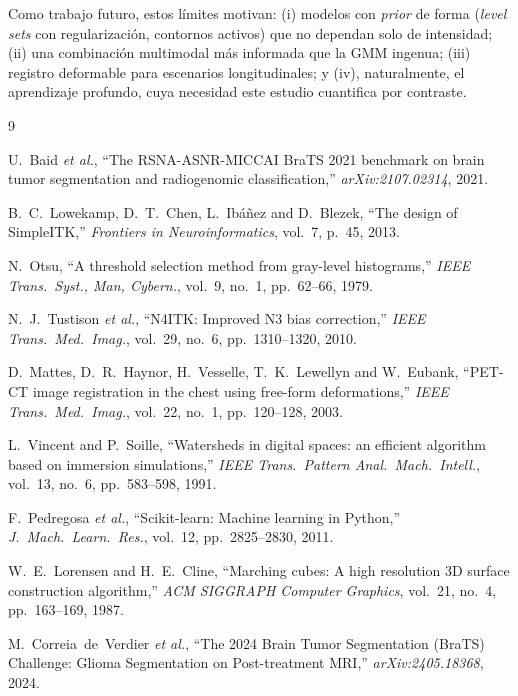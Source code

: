 \documentclass[conference]{IEEEtran}
\begin{document}
Como trabajo futuro, estos límites motivan: (i) modelos con
\emph{prior} de forma (\textit{level sets} con regularización,
contornos activos) que no dependan solo de intensidad; (ii) una
combinación multimodal más informada que la GMM ingenua;
(iii) registro deformable para escenarios longitudinales; y
(iv), naturalmente, el aprendizaje profundo, cuya necesidad este
estudio cuantifica por contraste.

\begin{thebibliography}{9}

U.~Baid \emph{et al.},
``The RSNA-ASNR-MICCAI BraTS 2021 benchmark on brain tumor
segmentation and radiogenomic classification,''
\emph{arXiv:2107.02314}, 2021.

B.~C.~Lowekamp, D.~T.~Chen, L.~Ibáñez and D.~Blezek,
``The design of SimpleITK,''
\emph{Frontiers in Neuroinformatics}, vol.~7, p.~45, 2013.

N.~Otsu,
``A threshold selection method from gray-level histograms,''
\emph{IEEE Trans.\ Syst., Man, Cybern.}, vol.~9, no.~1,
pp.~62--66, 1979.

N.~J.~Tustison \emph{et al.},
``N4ITK: Improved N3 bias correction,''
\emph{IEEE Trans.\ Med.\ Imag.}, vol.~29, no.~6,
pp.~1310--1320, 2010.

D.~Mattes, D.~R.~Haynor, H.~Vesselle, T.~K.~Lewellyn
and W.~Eubank,
``PET-CT image registration in the chest using free-form
deformations,''
\emph{IEEE Trans.\ Med.\ Imag.}, vol.~22, no.~1, pp.~120--128,
2003.

L.~Vincent and P.~Soille,
``Watersheds in digital spaces: an efficient algorithm based on
immersion simulations,''
\emph{IEEE Trans.\ Pattern Anal.\ Mach.\ Intell.}, vol.~13,
no.~6, pp.~583--598, 1991.

F.~Pedregosa \emph{et al.},
``Scikit-learn: Machine learning in Python,''
\emph{J.\ Mach.\ Learn.\ Res.}, vol.~12, pp.~2825--2830, 2011.

W.~E.~Lorensen and H.~E.~Cline,
``Marching cubes: A high resolution 3D surface construction
algorithm,''
\emph{ACM SIGGRAPH Computer Graphics}, vol.~21, no.~4,
pp.~163--169, 1987.

M.~Correia~de~Verdier \emph{et al.},
``The 2024 Brain Tumor Segmentation (BraTS) Challenge: Glioma
Segmentation on Post-treatment MRI,''
\emph{arXiv:2405.18368}, 2024.


\end{thebibliography}
\end{document}
